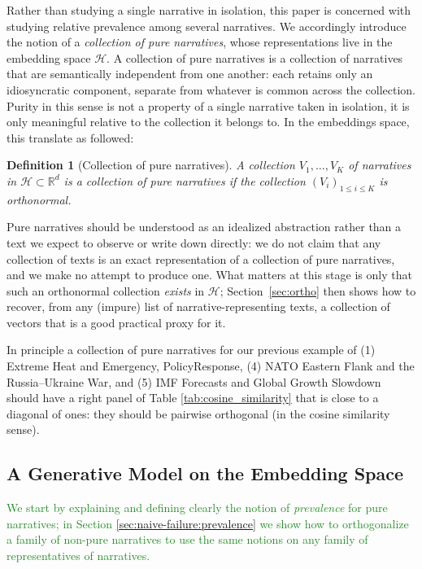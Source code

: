 \documentclass[
  journal=medium,
  manuscript=article-type,
  year=2025,
  volume=1,
]{cup-journal}
\newtheorem{definition}{Definition}
\def\narr#1{{\sc #1}}
\begin{document}
Rather than studying a single narrative in isolation, this paper is concerned with studying relative prevalence among several narratives. We accordingly introduce the notion of a \emph{collection of pure narratives}, whose representations live in the
embedding space $\mathcal H$. A collection of pure narratives is a collection of narratives that are semantically independent from one another: each retains only an idiosyncratic component, separate from whatever is common across the collection. Purity in this sense is not a property of a single narrative taken in isolation, it is only meaningful relative to the collection it belongs to. In the embeddings space, this translate as followed:

\begin{definition}[Collection of pure narratives]
A collection $V_1,\ldots,V_K$ of narratives in $\mathcal H \subset \mathbb R^d$
is a collection of \emph{pure narratives} if the collection $(V_i)_{1 \le i \le K}$ is orthonormal.
\end{definition}

Pure narratives should be understood as an idealized abstraction rather than a text we expect to observe or write down directly: we do not claim that any collection of texts is an exact representation of a collection of pure narratives, and we make no attempt to
produce one. What matters at this stage is only that such an orthonormal collection \emph{exists} in $\mathcal H$; Section~\ref{sec:ortho} then shows how to recover, from any (impure) list of narrative-representing texts, a collection of vectors that is a good practical proxy for it.

{\color{ForestGreen}
In principle a collection of pure narratives for our previous example of (1) \narr{Extreme Heat and Emergency, PolicyResponse}, (4) \narr{NATO Eastern Flank and the Russia–Ukraine War}, and (5) \narr{IMF Forecasts and Global Growth Slowdown} should have a right panel of Table \ref{tab:cosine_similarity} that is close to a diagonal of ones: they should be pairwise orthogonal (in the cosine similarity sense).
}

\subsection{A Generative Model on the Embedding Space}
\label{sec:model:generative}

\textcolor{ForestGreen}{
We start by explaining and defining clearly the notion of \emph{prevalence} for pure narratives;
in Section \ref{sec:naive-failure:prevalence} we show how to orthogonalize a family of non-pure narratives to use the same notions on any family of representatives of narratives.
}
\end{document}
